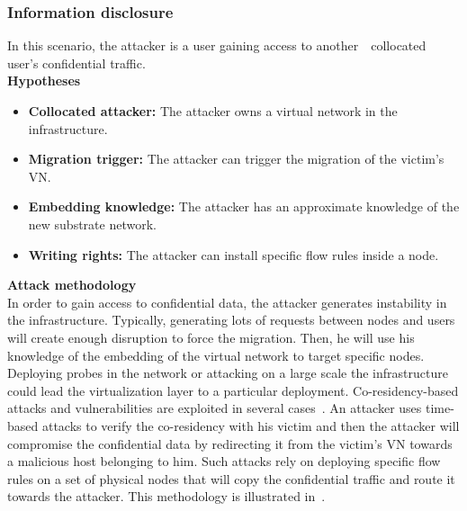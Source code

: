 \newpage
\subsubsection{Information disclosure}
In this scenario, the attacker is a  user  gaining access to another　collocated user's confidential traffic.\\
\textbf{Hypotheses}
\begin{itemize}
    \item \textbf{Collocated attacker:} The attacker owns a virtual network in the infrastructure.
    \item \textbf{Migration trigger:} The attacker can trigger the migration of the victim's VN.
    \item \textbf{Embedding knowledge:} The attacker has an approximate knowledge of the new substrate network.
    \item \textbf{Writing rights:} The attacker can install specific flow rules inside a node.
\end{itemize}


\textbf{Attack methodology}\textbf{\\}
In order to gain access to confidential data, the attacker generates instability in the infrastructure. Typically, generating lots of requests between nodes and users will create enough disruption to force the migration.
Then, he will use his knowledge of the embedding of the virtual network to target specific nodes.
Deploying probes in the network or attacking on a large scale the infrastructure could lead the virtualization layer to a particular deployment. Co-residency-based attacks and vulnerabilities are exploited in several cases~\cite{malicious-atya2017,nomad-Moon2015b,getoffmucloud-Ristenpart2009,stalling-atya2017}.
An attacker uses time-based attacks to verify the co-residency with his victim and then the attacker will compromise the confidential data by redirecting it from the victim's VN towards a malicious host belonging to him.
Such attacks rely on deploying specific flow rules on a set of physical nodes that will copy the confidential traffic and route it towards the attacker.
This methodology is illustrated in~\cite{Costa2015,Sphinx-Dhawan2015}.


